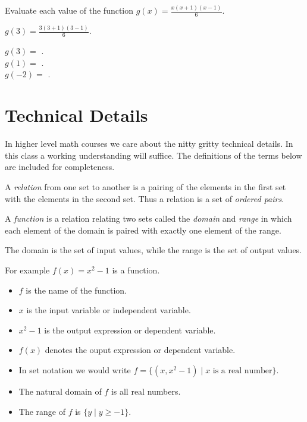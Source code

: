 \documentclass{ximera}
\begin{document}
\begin{question}
Evaluate each value of the function $g(x)=\frac{x(x+1)(x-1)}{6}$.

\begin{hint}
$g(3)=\frac{3\left(3+1\right)\left(3-1\right)}{6}$. 
\end{hint}
$g(3)=$ .\\
$g(1)=$ .\\
$g(-2)=$ .

\end{question}


\section*{Technical Details}
In higher level math courses we care about the nitty gritty technical details. In this class a working understanding will suffice. The definitions of the terms below are included for completeness.


A \emph{relation} from one set to another is a pairing of the elements in the first set with the elements in the second set. Thus a relation is a set of \emph{ordered pairs}.

A \emph{function} is a relation relating two sets called the \emph{domain} and \emph{range} in which each element of the domain is paired with exactly one element of the range. 

The domain is the set of input values, while the range is the set of output values.

For example $f(x)=x^2-1$ is a function.
\begin{itemize}
\item $f$ is the name of the function.
\item $x$ is the input variable or independent variable.
\item  $x^2-1$ is the output expression or dependent variable.
\item $f(x)$ denotes the ouput expression or dependent variable.
\item In set notation we would write $f=\{(x,x^2-1)\mid x\text{ is a real number}\}$.
\item The natural domain of $f$ is all real numbers.
\item The range of $f$ is $\{y\mid y\ge-1\}$.
\end{itemize}
\end{document}
